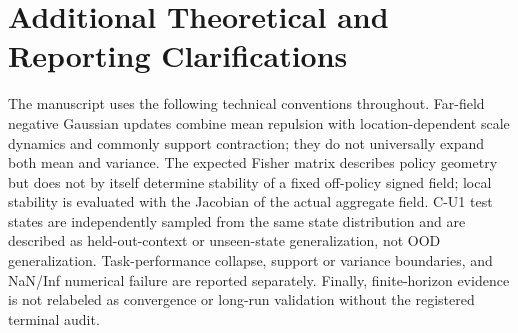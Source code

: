 \section{Additional Theoretical and Reporting Clarifications}
\label{app:corrections}

The manuscript uses the following technical conventions throughout. Far-field negative Gaussian updates combine mean repulsion with location-dependent scale dynamics and commonly support contraction; they do not universally expand both mean and variance. The expected Fisher matrix describes policy geometry but does not by itself determine stability of a fixed off-policy signed field; local stability is evaluated with the Jacobian of the actual aggregate field. C-U1 test states are independently sampled from the same state distribution and are described as held-out-context or unseen-state generalization, not OOD generalization. Task-performance collapse, support or variance boundaries, and NaN/Inf numerical failure are reported separately. Finally, finite-horizon evidence is not relabeled as convergence or long-run validation without the registered terminal audit.
